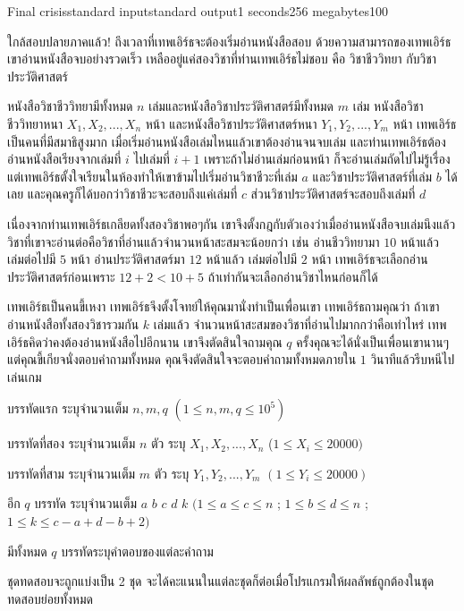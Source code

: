 \documentclass[11pt,a4paper]{article}
\begin{document}
\begin{problem}{Final crisis}{standard input}{standard output}{1 seconds}{256 megabytes}{100}
 
  ใกล้สอบปลายภาคแล้ว! ถึงเวลาที่เทพเอิร์ธจะต้องเริ่มอ่านหนังสือสอบ ด้วยความสามารถของเทพเอิร์ธ เขาอ่านหนังสือจบอย่างรวดเร็ว เหลืออยู่แค่สองวิชาที่ท่านเทพเอิร์ธไม่ชอบ คือ วิชาชีววิทยา กับวิชาประวัติศาสตร์
   
  หนังสือวิชาชีววิทยามีทั้งหมด $n$ เล่มและหนังสือวิชาประวัติศาสตร์มีทั้งหมด $m$ เล่ม หนังสือวิชาชีววิทยาหนา $X_1, X_2, ..., X_n $ หน้า และหนังสือวิชาประวัติศาสตร์หนา $Y_1, Y_2, ..., Y_m$ หน้า เทพเอิร์ธเป็นคนที่มีสมาธิสูงมาก เมื่อเริ่มอ่านหนังสือเล่มไหนแล้วเขาต้องอ่านจนจบเล่ม และท่านเทพเอิร์ธต้องอ่านหนังสือเรียงจากเล่มที่ $i$ ไปเล่มที่ $i+1$ เพราะถ้าไม่อ่านเล่มก่อนหน้า ก็จะอ่านเล่มถัดไปไม่รู้เรื่อง แต่เทพเอิร์ธตั้งใจเรียนในห้องทำให้เขาข้ามไปเริ่มอ่านวิชาชีวะที่เล่ม $a$ และวิชาประวัติศาสตร์ที่เล่ม $b$ ได้เลย และคุณครูก็ได้บอกว่าวิชาชีวะจะสอบถึงแค่เล่มที่ $c$ ส่วนวิชาประวัติศาสตร์จะสอบถึงเล่มที่ $d$
   
  เนื่องจากท่านเทพเอิร์ธเกลียดทั้งสองวิชาพอๆกัน เขาจึงตั้งกฎกับตัวเองว่าเมื่ออ่านหนังสือจบเล่มนึงแล้ววิชาที่เขาจะอ่านต่อคือวิชาที่อ่านแล้วจำนวนหน้าสะสมจะน้อยกว่า เช่น อ่านชีววิทยามา $10$ หน้าแล้ว เล่มต่อไปมี $5$ หน้า อ่านประวัติศาสตร์มา $12$ หน้าแล้ว เล่มต่อไปมี $2$ หน้า เทพเอิร์ธจะเลือกอ่านประวัติศาสตร์ก่อนเพราะ $12+2 < 10+5$ ถ้าเท่ากันจะเลือกอ่านวิชาไหนก่อนก็ได้
   
  เทพเอิร์ธเป็นคนขี้เหงา เทพเอิร์ธจึงตั้งโจทย์ให้คุณมานั่งทำเป็นเพื่อนเขา เทพเอิร์ธถามคุณว่า ถ้าเขาอ่านหนังสือทั้งสองวิชารวมกัน $k$ เล่มแล้ว จำนวนหน้าสะสมของวิชาที่อ่านไปมากกว่าคือเท่าไหร่ เทพเอิร์ธคิดว่าคงต้องอ่านหนังสือไปอีกนาน เขาจึงตัดสินใจถามคุณ $q$ ครั้งคุณจะได้นั่งเป็นเพื่อนเขานานๆ แต่คุณขี้เกียจนั่งตอบคำถามทั้งหมด คุณจึงตัดสินใจจะตอบคำถามทั้งหมดภายใน $1$ วินาทีแล้วรีบหนีไปเล่นเกม
   
   
  \InputFile
  บรรทัดแรก ระบุจำนวนเต็ม $ n,m,q$ $( 1\leq n,m,q\leq10^5)$
   
  บรรทัดที่สอง ระบุจำนวนเต็ม $n$ ตัว ระบุ $X_1, X_2, ..., X_n$ ($1\leq X_i\leq20000
  )$
   
  บรรทัดที่สาม ระบุจำนวนเต็ม $m$ ตัว ระบุ $Y_1,Y_2,...,Y_m$ $(1\leq Y_i\leq 20000)$
   
  อีก $q$ บรรทัด ระบุจำนวนเต็ม $a$ $b$ $c$ $d$ $k$ $(1\leq a\leq c\leq n $ ; $1\leq b\leq d\leq n $ ; $ 1\leq k\leq c-a+d-b+2)$
   
   
  \OutputFile
  มีทั้งหมด $q$ บรรทัดระบุคำตอบของแต่ละคำถาม
   
  \Scoring
  ชุดทดสอบจะถูกแบ่งเป็น 2 ชุด จะได้คะแนนในแต่ละชุดก็ต่อเมื่อโปรแกรมให้ผลลัพธ์ถูกต้องในชุดทดสอบย่อยทั้งหมด
   

\end{problem}
\end{document}
